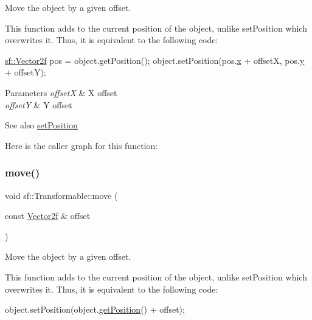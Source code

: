 Move the object by a given offset. 

This function adds to the current position of the object, unlike set\+Position which overwrites it. Thus, it is equivalent to the following code\+: 
\begin{DoxyCode}
\hyperlink{classsf_1_1_vector2}{sf::Vector2f} pos = \textcolor{keywordtype}{object}.getPosition();
\textcolor{keywordtype}{object}.setPosition(pos.\hyperlink{classsf_1_1_vector2_a1e6ad77fa155f3753bfb92699bd28141}{x} + offsetX, pos.\hyperlink{classsf_1_1_vector2_a420f2481b015f4eb929c75f2af564299}{y} + offsetY);
\end{DoxyCode}



\begin{DoxyParams}{Parameters}
{\em offsetX} & X offset \\
\hline
{\em offsetY} & Y offset\\
\hline
\end{DoxyParams}
\begin{DoxySeeAlso}{See also}
\hyperlink{classsf_1_1_transformable_a4dbfb1a7c80688b0b4c477d706550208}{set\+Position} 
\end{DoxySeeAlso}
Here is the caller graph for this function\+:
\mbox{\label{classsf_1_1_transformable_ab9ca691522f6ddc1a40406849b87c469}} 
\subsubsection{\texorpdfstring{move()}{move()}\hspace{0.1cm}{\footnotesize\ttfamily [2/2]}}
{\footnotesize\ttfamily void sf\+::\+Transformable\+::move (\begin{DoxyParamCaption}\item[{const \hyperlink{classsf_1_1_vector2}{Vector2f} \&}]{offset }\end{DoxyParamCaption})}



Move the object by a given offset. 

This function adds to the current position of the object, unlike set\+Position which overwrites it. Thus, it is equivalent to the following code\+: 
\begin{DoxyCode}
\textcolor{keywordtype}{object}.setPosition(\textcolor{keywordtype}{object}.\hyperlink{classsf_1_1_transformable_a73f9739bc6e74db2cea154bc8e94ec46}{getPosition}() + offset);
\end{DoxyCode}



